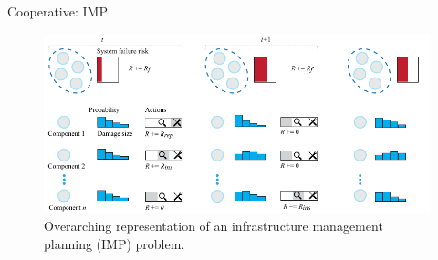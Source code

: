 \documentclass[9pt, hyperref={pdfusetitle,colorlinks=true,allcolors=DarkBlue}]{beamer}
\begin{document}
\begin{frame}{Cooperative: IMP}
    \begin{figure}
        \centering
        \includegraphics[width=\textwidth]{imp_intro.pdf}
        \caption{Overarching representation of an infrastructure management planning (IMP) problem.}
    \end{figure}
\end{frame}
\end{document}
